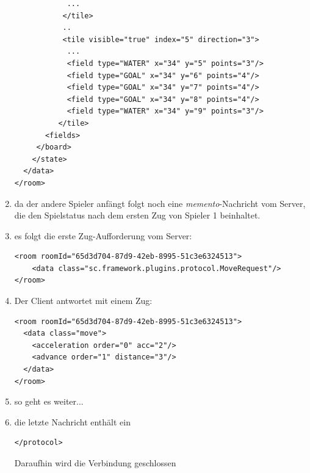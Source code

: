 \documentclass[12pt,a4paper, ngerman, oneside]{scrartcl}
\begin{document}
\begin{enumerate}
\begin{verbatim}
            ...
           </tile>
           ..
           <tile visible="true" index="5" direction="3">
            ...
            <field type="WATER" x="34" y="5" points="3"/>
            <field type="GOAL" x="34" y="6" points="4"/>
            <field type="GOAL" x="34" y="7" points="4"/>
            <field type="GOAL" x="34" y="8" points="4"/>
            <field type="WATER" x="34" y="9" points="3"/>
          </tile>
       <fields>
     </board>
    </state>
  </data>
</room>
\end{verbatim}
\item da der andere Spieler anfängt folgt noch eine \textit{memento}-Nachricht vom Server, die den Spielstatus nach dem ersten Zug von Spieler 1 beinhaltet.
\item es folgt die erste Zug-Aufforderung vom Server: \begin{verbatim}
<room roomId="65d3d704-87d9-42eb-8995-51c3e6324513">
    <data class="sc.framework.plugins.protocol.MoveRequest"/>
</room>
\end{verbatim}
\item Der Client antwortet mit einem Zug: \begin{verbatim}
<room roomId="65d3d704-87d9-42eb-8995-51c3e6324513">
  <data class="move">
    <acceleration order="0" acc="2"/>
    <advance order="1" distance="3"/>
  </data>
</room>
\end{verbatim}
\item so geht es weiter...
\item die letzte Nachricht enthält ein \begin{verbatim}
</protocol>
\end{verbatim}
Daraufhin wird die Verbindung geschlossen
\end{enumerate}
\end{document}
